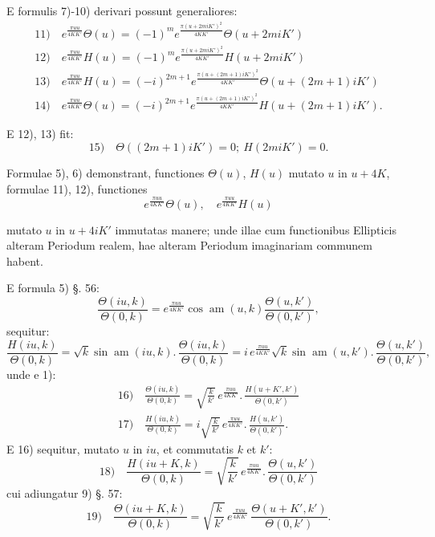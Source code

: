 \documentclass{article}
\begin{document}
E formulis 7)-10) derivari possunt generaliores:
\[
\begin{gathered}
\text{11)}\quad e^{\frac{\pi uu}{4KK'}}\Theta(u)=(-1)^{m}e^{\frac{\pi(u+2miK')^{2}}{4KK'}}\Theta(u+2miK')\\[1.5ex]
\text{12)}\quad e^{\frac{\pi uu}{4KK'}}H(u)=(-1)^{m}e^{\frac{\pi(u+2miK')^{2}}{4KK'}}H(u+2miK')\\[1.5ex]
\text{13)}\quad e^{\frac{\pi uu}{4KK'}}H(u)=(-i)^{2m+1}e^{\frac{\pi(u+(2m+1)iK')^{2}}{4KK'}}\Theta(u+(2m+1)iK')\\[1.5ex]
\text{14)}\quad e^{\frac{\pi uu}{4KK'}}\Theta(u)=(-i)^{2m+1}e^{\frac{\pi(u+(2m+1)iK')^{2}}{4KK'}}H(u+(2m+1)iK').
\end{gathered}
\]

E 12), 13) fit:
\[
\text{15)}\quad\Theta\left((2m+1)iK'\right)=0;\ H(2miK')=0.
\]

Formulae 5), 6) demonstrant, functiones $\Theta(u)$, $H(u)$ mutato $u$ in $u+4K$, formulae 11), 12), functiones
\[
e^{\frac{\pi uu}{4KK'}}\Theta(u),\quad e^{\frac{\pi uu}{4KK'}}H(u)
\]

mutato $u$ in $u+4iK'$ immutatas manere; unde illae cum functionibus Ellipticis alteram Periodum realem, hae alteram Periodum imaginariam communem habent.

E formula 5) §. 56:
\[
\frac{\Theta(iu,k)}{\Theta(0,k)}=e^{\frac{\pi uu}{4KK'}}\cos\operatorname{am}(u,k)\frac{\Theta(u,k')}{\Theta(0,k')},
\]
sequitur:
\[
\frac{H(iu,k)}{\Theta(0,k)}=\sqrt{k}\sin\operatorname{am}(iu,k).\,\frac{\Theta(iu,k)}{\Theta(0,k)}=i\,e^{\frac{\pi uu}{4KK'}}\sqrt{k}\sin\operatorname{am}(u,k').\,\frac{\Theta(u,k')}{\Theta(0,k')},
\]
unde e 1):
\[
\begin{gathered}
\text{16)}\quad\frac{\Theta(iu,k)}{\Theta(0,k)}=\sqrt{\frac{k}{k'}}\,e^{\frac{\pi uu}{4KK'}}.\,\frac{H(u+K',k')}{\Theta(0,k')}\\[1.5ex]
\text{17)}\quad\frac{H(iu,k)}{\Theta(0,k)}=i\sqrt{\frac{k}{k'}}\,e^{\frac{\pi uu}{4KK'}}.\,\frac{H(u,k')}{\Theta(0,k')}.
\end{gathered}
\]
E 16) sequitur, mutato $u$ in $iu$, et commutatis $k$ et $k'$:
\[
\text{18)}\quad\frac{H(iu+K,k)}{\Theta(0,k)}=\sqrt{\frac{k}{k'}}\,e^{\frac{\pi uu}{4KK'}}.\,\frac{\Theta(u,k')}{\Theta(0,k')}
\]
cui adiungatur 9) §. 57:
\[
\text{19)}\quad\frac{\Theta(iu+K,k)}{\Theta(0,k)}=\sqrt{\frac{k}{k'}}\,e^{\frac{\pi uu}{4KK'}}\,\frac{\Theta(u+K',k')}{\Theta(0,k')}.
\]
\end{document}
